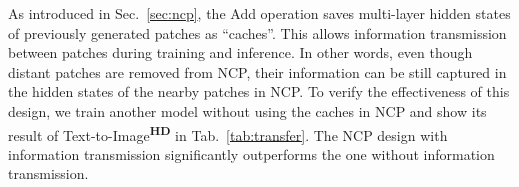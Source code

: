 \documentclass{article}
\begin{document}
As introduced in Sec.~\ref{sec:ncp}, the Add operation saves multi-layer hidden states of previously generated patches as ``caches''. 
This allows information transmission between patches during training and inference. In other words, even though distant patches are removed from NCP, their information can be still captured in the hidden states of the nearby patches in NCP. 
To verify the effectiveness of this design, we train another model without using the caches in NCP and show its result of Text-to-Image\textsuperscript{\textbf{HD}} in Tab.~\ref{tab:transfer}.
The NCP design with information transmission significantly outperforms the one without information transmission.


\end{document}
